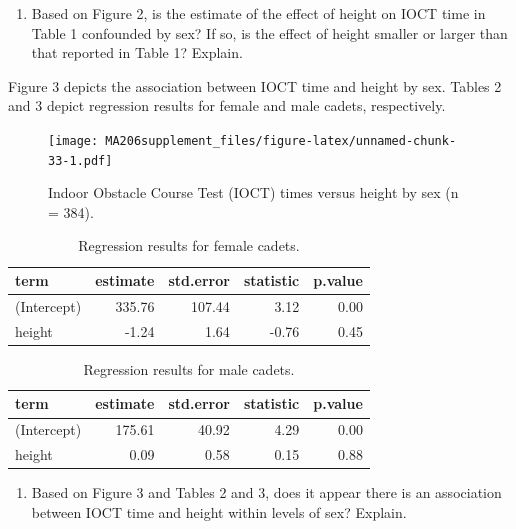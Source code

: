 \documentclass[
]{book}
\providecommand{\tightlist}{%
  \setlength{\itemsep}{0pt}\setlength{\parskip}{0pt}}
\begin{document}
\begin{enumerate}
\def\labelenumi{\arabic{enumi}.}
\setcounter{enumi}{12}
\tightlist
\item
  Based on Figure 2, is the estimate of the effect of height on IOCT time in Table 1 confounded by sex? If so, is the effect of height smaller or larger than that reported in Table 1? Explain.
\end{enumerate}

\vspace{1in}

\newpage

Figure 3 depicts the association between IOCT time and height by sex. Tables 2 and 3 depict regression results for female and male cadets, respectively.

\begin{figure}
\centering
\texttt{[image: MA206supplement\_files/figure-latex/unnamed-chunk-33-1.pdf]}
\caption{\label{fig:unnamed-chunk-33}Indoor Obstacle Course Test (IOCT) times versus height by sex (n = 384).}
\end{figure}

\begin{table}

\caption{\label{tab:unnamed-chunk-34}Regression results for female cadets.}
\centering
\begin{tabular}[t]{l|r|r|r|r}
\hline
term & estimate & std.error & statistic & p.value\\
\hline
(Intercept) & 335.76 & 107.44 & 3.12 & 0.00\\
\hline
height & -1.24 & 1.64 & -0.76 & 0.45\\
\hline
\end{tabular}
\end{table}

\begin{table}

\caption{\label{tab:unnamed-chunk-34}Regression results for male cadets.}
\centering
\begin{tabular}[t]{l|r|r|r|r}
\hline
term & estimate & std.error & statistic & p.value\\
\hline
(Intercept) & 175.61 & 40.92 & 4.29 & 0.00\\
\hline
height & 0.09 & 0.58 & 0.15 & 0.88\\
\hline
\end{tabular}
\end{table}

\begin{enumerate}
\def\labelenumi{\arabic{enumi}.}
\setcounter{enumi}{13}
\tightlist
\item
  Based on Figure 3 and Tables 2 and 3, does it appear there is an association between IOCT time and height within levels of sex? Explain.
\end{enumerate}
\end{document}
